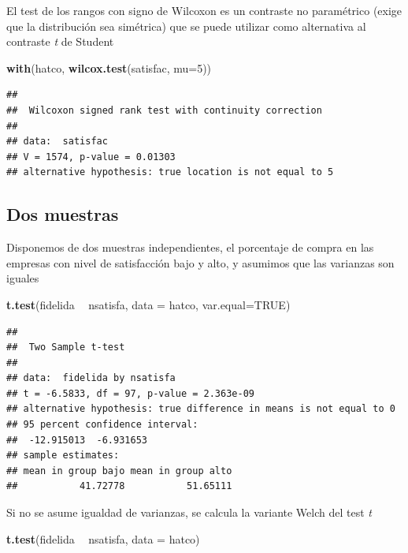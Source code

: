 \documentclass[]{book}
\newenvironment{Shaded}{\begin{snugshade}}{\end{snugshade}}
\newcommand{\KeywordTok}[1]{\textcolor[rgb]{0.13,0.29,0.53}{\textbf{#1}}}
\newcommand{\DataTypeTok}[1]{\textcolor[rgb]{0.13,0.29,0.53}{#1}}
\newcommand{\DecValTok}[1]{\textcolor[rgb]{0.00,0.00,0.81}{#1}}
\newcommand{\StringTok}[1]{\textcolor[rgb]{0.31,0.60,0.02}{#1}}
\newcommand{\OtherTok}[1]{\textcolor[rgb]{0.56,0.35,0.01}{#1}}
\newcommand{\OperatorTok}[1]{\textcolor[rgb]{0.81,0.36,0.00}{\textbf{#1}}}
\newcommand{\NormalTok}[1]{#1}
\begin{document}
El test de los rangos con signo de Wilcoxon es un contraste no
paramétrico (exige que la distribución sea simétrica) que se puede
utilizar como alternativa al contraste \emph{t} de Student

\begin{Shaded}
\begin{Highlighting}[]
\KeywordTok{with}\NormalTok{(hatco, }\KeywordTok{wilcox.test}\NormalTok{(satisfac, }\DataTypeTok{mu=}\DecValTok{5}\NormalTok{))}
\end{Highlighting}
\end{Shaded}

\begin{verbatim}
## 
##  Wilcoxon signed rank test with continuity correction
## 
## data:  satisfac
## V = 1574, p-value = 0.01303
## alternative hypothesis: true location is not equal to 5
\end{verbatim}

\subsection{Dos muestras}\label{dos-muestras}

Disponemos de dos muestras independientes, el porcentaje de compra en
las empresas con nivel de satisfacción bajo y alto, y asumimos que las
varianzas son iguales

\begin{Shaded}
\begin{Highlighting}[]
\KeywordTok{t.test}\NormalTok{(fidelida }\OperatorTok{~}\StringTok{ }\NormalTok{nsatisfa, }\DataTypeTok{data =}\NormalTok{ hatco, }\DataTypeTok{var.equal=}\OtherTok{TRUE}\NormalTok{)}
\end{Highlighting}
\end{Shaded}

\begin{verbatim}
## 
##  Two Sample t-test
## 
## data:  fidelida by nsatisfa
## t = -6.5833, df = 97, p-value = 2.363e-09
## alternative hypothesis: true difference in means is not equal to 0
## 95 percent confidence interval:
##  -12.915013  -6.931653
## sample estimates:
## mean in group bajo mean in group alto 
##           41.72778           51.65111
\end{verbatim}

Si no se asume igualdad de varianzas, se calcula la variante Welch del
test \emph{t}

\begin{Shaded}
\begin{Highlighting}[]
\KeywordTok{t.test}\NormalTok{(fidelida }\OperatorTok{~}\StringTok{ }\NormalTok{nsatisfa, }\DataTypeTok{data =}\NormalTok{ hatco)}
\end{Highlighting}
\end{Shaded}
\end{document}
